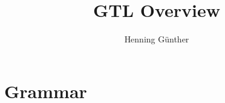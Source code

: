 \documentclass[a4paper]{scrartcl}
\title{GTL Overview}
\author{Henning Günther}
\begin{document}
\maketitle
\section{Grammar}

\end{document}
